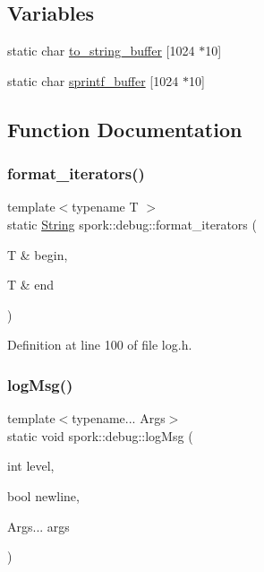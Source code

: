 \subsection*{Variables}
\begin{DoxyCompactItemize}
\item 
static char \hyperlink{namespacespork_1_1debug_aa1305eea424e282f851d800b690e1682}{to\+\_\+string\+\_\+buffer} \mbox{[}1024 $\ast$10\mbox{]}
\item 
static char \hyperlink{namespacespork_1_1debug_ad495c6327f1d571e7db4d5698410ca7d}{sprintf\+\_\+buffer} \mbox{[}1024 $\ast$10\mbox{]}
\end{DoxyCompactItemize}


\subsection{Function Documentation}
\mbox{\label{namespacespork_1_1debug_adb4d1a890888f2ed6eb0e85d4cea5c49}} 
\subsubsection{\texorpdfstring{format\+\_\+iterators()}{format\_iterators()}}
{\footnotesize\ttfamily template$<$typename T $>$ \\
static \hyperlink{my_string_8h_afbeda3fd1bdc8c37d01bdf9f5c8274ff}{String} spork\+::debug\+::format\+\_\+iterators (\begin{DoxyParamCaption}\item[{T \&}]{begin,  }\item[{T \&}]{end }\end{DoxyParamCaption})\hspace{0.3cm}{\ttfamily [static]}}



Definition at line 100 of file log.\+h.

\mbox{\label{namespacespork_1_1debug_ae5b65f263f4686cf365b19f468fc1e53}} 
\subsubsection{\texorpdfstring{log\+Msg()}{logMsg()}}
{\footnotesize\ttfamily template$<$typename... Args$>$ \\
static void spork\+::debug\+::log\+Msg (\begin{DoxyParamCaption}\item[{int}]{level,  }\item[{bool}]{newline,  }\item[{Args...}]{args }\end{DoxyParamCaption})\hspace{0.3cm}{\ttfamily [static]}}



